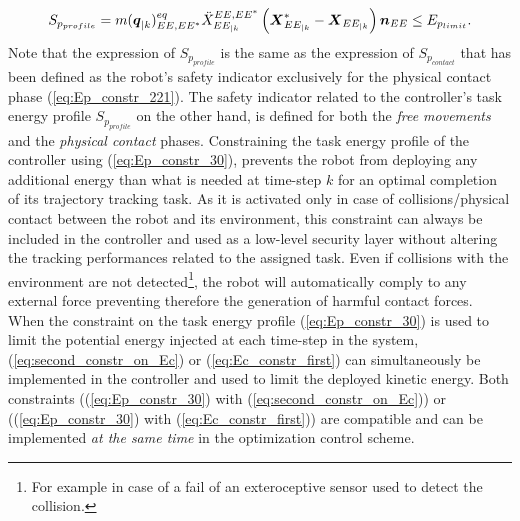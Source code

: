\begin{equation}
S_{p_{profile}} = m(\mbox{\boldmath${q}$}_{|k})_{EE,EE^*}^{eq} \ddot{X}_{EE_{|k}}^{EE,EE^*} \left(\mbox{\boldmath${X}$}_{EE_{|k}}^{*} - \mbox{\boldmath${X}$}_{EE_{|k}}\right) \mbox{\boldmath${n}$}_{EE} \leq E_{p_{limit}}.
\label{eq:Ep_constr_30}
\end{equation} 
Note that the expression of $S_{p_{profile}}$ is the same as the expression of $S_{p_{contact}}$ that has been defined as the robot's safety indicator exclusively for the physical contact phase (\ref{eq:Ep_constr_221}). The safety indicator related to the controller's task energy profile $S_{p_{profile}}$ on the other hand, is defined for both the \textit{free movements} and the \textit{physical contact} phases.  
Constraining the task energy profile of the controller using (\ref{eq:Ep_constr_30}), prevents the robot from deploying any additional energy than what is needed at time-step $k$ for an optimal completion of its trajectory tracking task. As it is activated only in case of collisions/physical contact between the robot and its environment, this constraint can always be included in the controller and used as a low-level security layer without altering the tracking performances related to the assigned task. Even if collisions with the environment are not detected\footnote{For example in case of a fail of an exteroceptive sensor used to detect the collision.}, the robot will automatically comply to any external force preventing therefore the generation of harmful contact forces. \\
When the constraint on the task energy profile (\ref{eq:Ep_constr_30}) is used to limit the potential energy injected at each time-step in the system, (\ref{eq:second_constr_on_Ec}) or (\ref{eq:Ec_constr_first}) can simultaneously be implemented in the controller and used to limit the deployed kinetic energy. Both constraints ((\ref{eq:Ep_constr_30}) with (\ref{eq:second_constr_on_Ec})) or ((\ref{eq:Ep_constr_30}) with (\ref{eq:Ec_constr_first})) are compatible and can be implemented \textit{at the same time} in the optimization control scheme. \\
